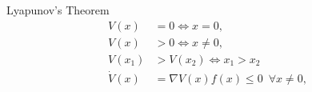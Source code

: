 \begin{slide}{Lyapunov's Theorem}
  \begin{equation}
    \begin{aligned}
      V(x)       & = 0 \iff x = 0,                                       \\
      V(x)       & > 0 \iff x \ne 0,                                     \\
      V(x_{1})   & > V(x_{2}) \iff x_{1} > x_{2}                         \\
      \dot{V}(x) & = \nabla{}V(x)f(x) \le 0 \phantom{0} \forall x \ne 0,
    \end{aligned}
  \end{equation}
\end{slide}
